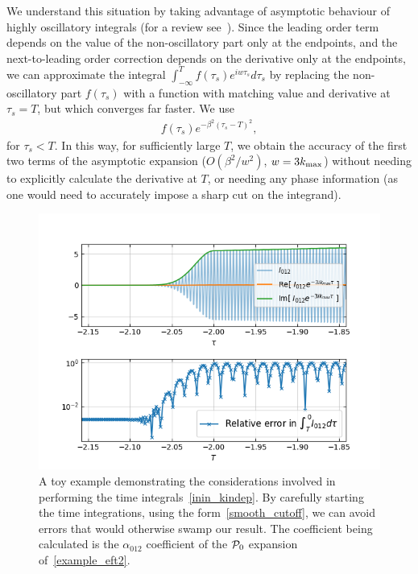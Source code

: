 We understand this situation by
taking advantage of asymptotic behaviour of highly oscillatory
integrals (for a review see~\cite{iserles_2005}).
Since the leading order term depends on
the value of the non-oscillatory part only at the endpoints,
and the next-to-leading order correction depends on the
derivative only at the endpoints, we can approximate the integral
$\int_{-\infty}^T f(\tau_s)e^{iw\tau_s}d\tau_s$
by replacing the non-oscillatory part $f(\tau_s)$ with a function with
matching value and derivative at $\tau_s=T$,
but which converges far faster.
We use
\begin{align}\label{smooth_cutoff}
f(\tau_s)e^{-\beta^2(\tau_s-T)^2},
\end{align}
for $\tau_s<T$.
In this way, for sufficiently large $T$,
we obtain the accuracy of the
first two terms of the asymptotic expansion
($O(\beta^2/w^2)$, $w=3{k_\text{max}}$) without needing to explicitly
calculate the derivative at $T$, or needing any phase information (as
one would need to accurately impose a sharp cut on the integrand).


\begin{figure}[!pth]
\centering
\includegraphics[width=\columnwidth]{plots/time_integrand.png}
\caption{
    A toy example demonstrating the considerations involved in performing the
    time integrals~\eqref{inin_kindep}.
    By carefully starting the time integrations,
    using the form~\eqref{smooth_cutoff}, we can avoid
    errors that would otherwise swamp our result.
    The coefficient being calculated is the
    $\alpha_{012}$ coefficient of the $\mathcal{P}_0$ expansion of~\eqref{example_eft2}.
}\label{fig:time_integrands}
\end{figure}

